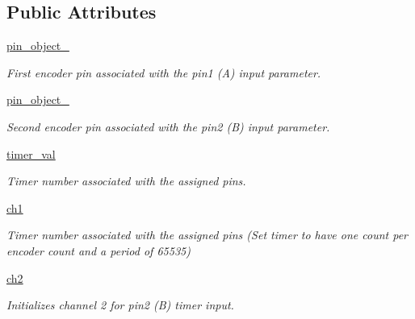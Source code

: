 \subsection*{Public Attributes}
\begin{DoxyCompactItemize}
\item 
\hyperlink{classencoder_1_1Encoder_aeda788d6a64794cb480a3d472c2efa4a}{pin\+\_\+object\+\_}\hypertarget{classencoder_1_1Encoder_aeda788d6a64794cb480a3d472c2efa4a}{}\label{classencoder_1_1Encoder_aeda788d6a64794cb480a3d472c2efa4a}

\begin{DoxyCompactList}\small\item\em First encoder pin associated with the pin1 (A) input parameter. \end{DoxyCompactList}\item 
\hyperlink{classencoder_1_1Encoder_a7c94c69c4097a87a93ef3d4452fc2581}{pin\+\_\+object\+\_}\hypertarget{classencoder_1_1Encoder_a7c94c69c4097a87a93ef3d4452fc2581}{}\label{classencoder_1_1Encoder_a7c94c69c4097a87a93ef3d4452fc2581}

\begin{DoxyCompactList}\small\item\em Second encoder pin associated with the pin2 (B) input parameter. \end{DoxyCompactList}\item 
\hyperlink{classencoder_1_1Encoder_a2fcfafbf246c24121f3c299303615d72}{timer\+\_\+val}\hypertarget{classencoder_1_1Encoder_a2fcfafbf246c24121f3c299303615d72}{}\label{classencoder_1_1Encoder_a2fcfafbf246c24121f3c299303615d72}

\begin{DoxyCompactList}\small\item\em Timer number associated with the assigned pins. \end{DoxyCompactList}\item 
\hyperlink{classencoder_1_1Encoder_a076f2be10f58f336dd7fb70b55feee6f}{ch1}
\begin{DoxyCompactList}\small\item\em Timer number associated with the assigned pins (Set timer to have one count per encoder count and a period of 65535) \end{DoxyCompactList}\item 
\hyperlink{classencoder_1_1Encoder_a1c05e07f7131cc3d173daf4d26b605b5}{ch2}\hypertarget{classencoder_1_1Encoder_a1c05e07f7131cc3d173daf4d26b605b5}{}\label{classencoder_1_1Encoder_a1c05e07f7131cc3d173daf4d26b605b5}

\begin{DoxyCompactList}\small\item\em Initializes channel 2 for pin2 (B) timer input. \end{DoxyCompactList}\end{DoxyCompactItemize}


